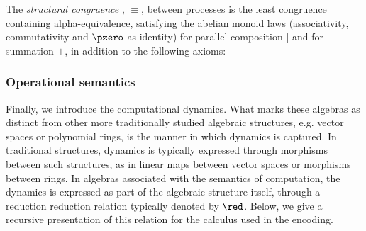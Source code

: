 \begin{definition}
  The {\em structural congruence} \cite{SangiorgiWalker} , $\equiv$, between processes is the
  least congruence containing alpha-equivalence, satisfying the
  abelian monoid laws (associativity, commutativity and $\pzero$ as
  identity) for parallel composition $|$ and for summation $+$, in addition to the
  following axioms:
\end{definition}

\subsubsection{Operational semantics} 

Finally, we introduce the computational dynamics. What marks these
algebras as distinct from other more traditionally studied algebraic
structures, e.g. vector spaces or polynomial rings, is the manner in
which dynamics is captured. In traditional structures, dynamics is typically
expressed through morphisms between such structures, as in linear maps
between vector spaces or morphisms between rings. In algebras
associated with the semantics of computation, the dynamics is
expressed as part of the algebraic structure itself, through a
reduction reduction relation typically denoted by $\red$. Below, we
give a recursive presentation of this relation for the calculus used
in the encoding.


